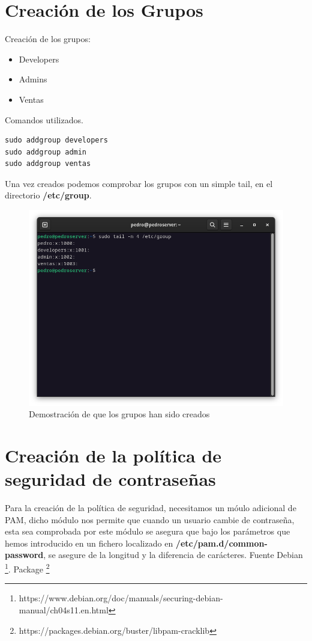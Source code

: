 \section{Creación de los Grupos}

Creación de los grupos:

\begin{itemize}
\item Developers
\item Admins
\item Ventas
\end{itemize}

Comandos utilizados.

\begin{lstlisting}[style=mybash]
sudo addgroup developers
sudo addgroup admin
sudo addgroup ventas
\end{lstlisting}

Una vez creados podemos comprobar los grupos con un simple tail, en el directorio \textbf{/etc/group}.

\begin{figure}[H]
	\centering
	\includegraphics[scale=0.30]{00}
	\caption{Demostración de que los grupos han sido creados}
\end{figure}

\section{Creación de la política de seguridad de contraseñas}

Para la creación de la política de seguridad, necesitamos un móulo adicional de PAM, dicho módulo nos permite que cuando un usuario cambie de contraseña, esta sea comprobada por este módulo se asegura que bajo los parámetros que hemos introducido en un fichero localizado en \textbf{/etc/pam.d/common-password}, se asegure de la longitud y la diferencia de carácteres. Fuente Debian \footnote{https://www.debian.org/doc/manuals/securing-debian-manual/ch04s11.en.html}. Package \footnote{https://packages.debian.org/buster/libpam-cracklib}
\vspace{5mm}

